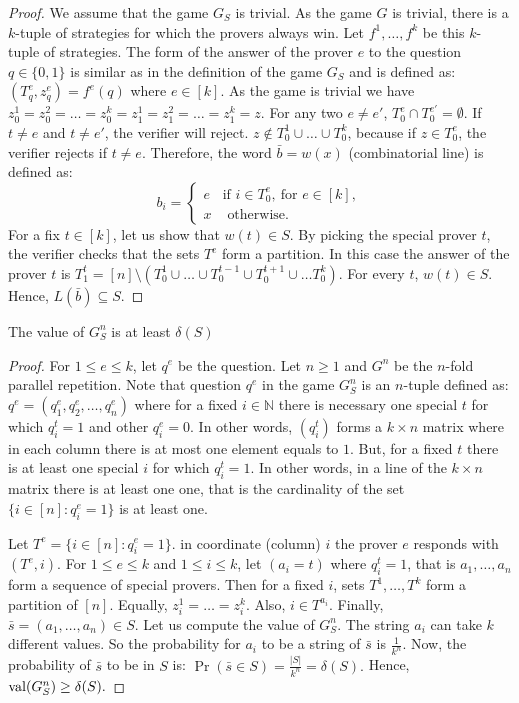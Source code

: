 \begin{proof}
We assume that the game $G_S$ is trivial. As the game $G$ is trivial, there is a $k$-tuple of strategies for which the provers  always win.  Let $f^1, \ldots, f^k$ be this $k$-tuple of  strategies. The form of the answer of the prover $e$ to the question $q \in \{0,1\}$ is similar as in the definition of the game $G_S$ and is defined as: $(T_q^e, z_q^e)=f^e(q)$ where $e \in [k]$.  As the game is trivial we have $z_0^1=z_0^2= \ldots=z_0^k=z_1^1=z_1^2= \ldots=z_1^k=z$. 
For any two $e\neq e'$, $T_0^e \cap T_0^{e'}= \emptyset$. If $t \neq e$ and $t\neq e'$, the verifier will reject.
$z \notin T_0^1 \cup \ldots \cup T_0^k$, because if $z \in T_0^e$, the verifier rejects if $t \neq e$. Therefore, the word $\bar{b}=w(x)$ (combinatorial line)  is defined as: $$b_i=\left\lbrace \begin{array}{ll} e & \text{if } i \in T_0^e, \ \text{for }e \in [k], \\ x & \text{ otherwise}.\end{array} \right.$$
For a fix $t \in [k]$, let us show that $w(t) \in S.$ By picking the special prover $t$, the verifier checks that the sets $T^e$ form a partition. In this case the answer of the prover $t$ is $T_1^t=[n] \setminus \left(T_0^1 \cup \ldots \cup T_0^{t-1} \cup T_0^{t+1} \cup \ldots T_0^k	 \right) .$ For every $t$, $w(t) \in S.$ Hence, $L(\bar{b}) \subseteq S.$
\end{proof}

\begin{pro}	 The value of $G_S^n$ is at least $\delta(S)$	  \label{pr3} \end{pro}

\begin{proof}
For $1\leq e \leq k$, let $q^e$ be the question. Let $n \geq 1$ and $G^n$ be the $n$-fold parallel repetition. Note that question $q^e$ in the game $G^n_S$ is an $n$-tuple defined as: $q^e=(q_1^e, q_2^e, \ldots, q_n^e)$ where for a fixed $i \in \mathbb{N}$ there is necessary  one special $t$ for which $q_i^t=1$ and other $q_i^e=0$.  In other words, $(q_i^t)$  forms a  $k \times n$ matrix where in each column there is at most one element equals to $1.$ But, for a fixed $t$ there is at least one special $i$ for which $q_i^t=1$. In other words, in a line of the $k \times n$ matrix there is at least one one, that is the cardinality of the set $\{i \in [n]: q_i^e=1\}$ is at least one.

Let  $T^e=\{i \in [n]: q_i^e=1\}$. in coordinate (column) $i$ the prover $e$ responds with $(T^e,i).$ For $1\leq e \leq k$ and $1\leq i  \leq k$, let  $(a_i=t)$ where $q_i^t=1$, that is $a_1, \ldots, a_n$ form a sequence of special provers.  Then for a fixed $i$, sets $T^1, \ldots, T^k$ form a partition of $[n].$ Equally, $z_i^1=\ldots=z_i^k.$ Also, $i \in T^{a_i}$. Finally, $\bar{s}=(a_1, \ldots, a_n) \in S.$ Let us compute the value of $G_S^n$. The string $a_i$ can take $k$ different values. So the probability for $a_i$ to be a string of $\bar{s}$ is $\frac{1}{k^n}$. Now, the probability of $\bar{s}$ to be in $S$ is:  $\Pr (\bar{s} \in S)=  \frac{|S|}{k^n}=\delta(S).$ Hence, $\mathrm{val} (G_S^n) \geq \delta (S).$

\end{proof}


